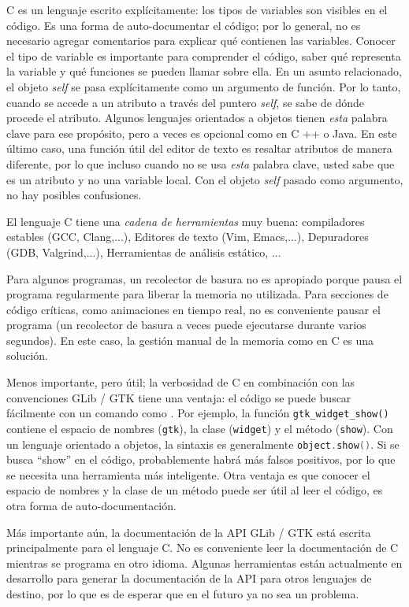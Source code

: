 C es un lenguaje escrito explícitamente: los tipos de variables son visibles en el código. Es una forma de auto-documentar el código; por lo general, no es necesario agregar comentarios para explicar qué contienen las variables. Conocer el tipo de variable es importante para comprender el código, saber qué representa la variable y qué funciones se pueden llamar sobre ella. En un asunto relacionado, el objeto \emph{self} se pasa explícitamente como un argumento de función. Por lo tanto, cuando se accede a un atributo a través del puntero \emph{self}, se sabe de dónde procede el atributo. Algunos lenguajes orientados a objetos tienen \emph{esta} palabra clave para ese propósito, pero a veces es opcional como en C ++ o Java. En este último caso, una función útil del editor de texto es resaltar atributos de manera diferente, por lo que incluso cuando no se usa \emph{esta} palabra clave, usted sabe que es un atributo y no una variable local. Con el objeto \emph{self} pasado como argumento, no hay posibles confusiones.

El lenguaje C tiene una \emph{cadena de herramientas} muy buena: compiladores estables (GCC, Clang,...), Editores de texto (Vim, Emacs,...), Depuradores (GDB, Valgrind,...), Herramientas de análisis estático, ...

Para algunos programas, un recolector de basura no es apropiado porque pausa el programa regularmente para liberar la memoria no utilizada. Para secciones de código críticas, como animaciones en tiempo real, no es conveniente pausar el programa (un recolector de basura a veces puede ejecutarse durante varios segundos). En este caso, la gestión manual de la memoria como en C es una solución.

Menos importante, pero útil; la verbosidad de C en combinación con las convenciones GLib / GTK tiene una ventaja: el código se puede buscar fácilmente con un comando como . Por ejemplo, la función \lstinline{gtk_widget_show()} contiene el espacio de nombres (\lstinline{gtk}), la clase (\lstinline{widget}) y el método (\lstinline{show}). Con un lenguaje orientado a objetos, la sintaxis es generalmente \lstinline[language=C++]{object.show()}. Si se busca ``show'' en el código, probablemente habrá más falsos positivos, por lo que se necesita una herramienta más inteligente. Otra ventaja es que conocer el espacio de nombres y la clase de un método puede ser útil al leer el código, es otra forma de auto-documentación.


Más importante aún, la documentación de la API GLib / GTK está escrita principalmente para el lenguaje C. No es conveniente leer la documentación de C mientras se programa en otro idioma. Algunas herramientas están actualmente en desarrollo para generar la documentación de la API para otros lenguajes de destino, por lo que es de esperar que en el futuro ya no sea un problema.

